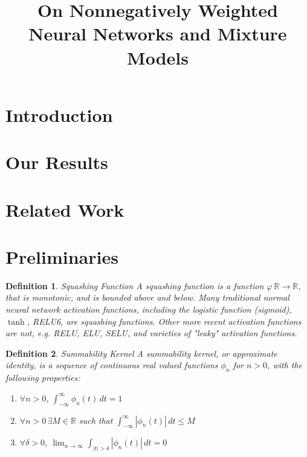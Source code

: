 \documentclass{article} %
\title{On Nonnegatively Weighted Neural Networks and Mixture Models}
\newtheorem{defn}{Definition}[section]
\newcommand{\R}{\mathbb{R}}
\begin{document}
\maketitle

\begin{abstract}

\end{abstract}


\section{Introduction}

\section{Our Results}

\section{Related Work}

\section{Preliminaries}

\begin{defn}{Squashing Function}
A squashing function is a function $\varphi\:\R \to \R$, that is monotonic, and is bounded above and below.
Many traditional normal neural network activation functions, including the logistic function (sigmoid), $\tanh$, RELU6, are squashing functions.
Other more recent activation functions are not, e.g. RELU, ELU, SELU, and varieties of "leaky" activation functions.
\end{defn}

\begin{defn}{Summability Kernel}
A summability kernel, or approximate identity, is a sequence of continuous real valued functions $\phi_n$ for $n>0$, with the following properties:
\begin{enumerate}
	\item $\forall n>0$, $\int_{-\infty}^{\infty}\phi_{n}(t)\,dt=1$
	\item $\forall n>0\, \exists M \in \R$ such that $\int_{-\infty}^{\infty}|\phi_{n}(t)|\,dt\le M$
	\item $\forall \delta > 0$, ${\displaystyle \lim_{n\to\infty}}\int_{|t|>\delta}|\phi_{n}(t)|\,dt = 0$
\end{enumerate}
\end{defn}
\end{document}
